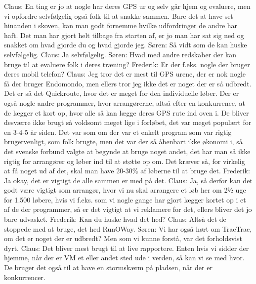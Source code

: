 Claus: En ting er jo at nogle har deres GPS ur og selv går hjem og evaluere, men vi opfordre selvfølgelig også folk til at snakke sammen. Bare det at have set hinanden i skoven, kan man godt fornemme hvilke udfordringer de andre har haft. Det man har gjort helt tilbage fra starten af, er jo man har sat sig ned og snakket om hvad gjorde du og hvad gjorde jeg. \newline
Søren: Så vidt som de kan huske selvfølgelig.\newline
Claus: Ja selvfølgelig. \newline
Søren: Hvad med andre redskaber der kan bruge til at evaluere folk i deres træning?\newline
Frederik: Er der f.eks. nogle der bruger deres mobil telefon?\newline
Claus: Jeg tror det er mest til GPS urene, der er nok nogle få der bruger Endomondo, men ellers tror jeg ikke det er noget der er så udbredt. Det er så det Quickroute, hvor det er meget for den individuelle løber. Der er også nogle andre programmer, hvor arrangørerne, altså efter en konkurrence, at de lægger et kort op, hvor alle så kan lægge deres GPS rute ind oven i. De bliver desværre ikke brugt så voldsomt meget lige i forløbet, det var meget populært for en 3-4-5 år siden. Det var som om der var et enkelt program som var rigtig brugervenligt, som folk brugte, men det var der så åbenbart ikke økonomi i, så det svenske forbund valgte at begynde at bruge noget andet, det har man så ikke rigtig for arrangører og løber ind til at støtte op om. Det kræver så, for virkelig at få noget ud af det, skal man have 20-30\% af løberne til at bruge det. \newline
Frederik: Ja okay, det er vigtigt de alle sammen er med på det. \newline
Claus: Ja, så derfor kan det godt være vigtigt som arrangør, hvor vi nu skal arrangere et løb her om 2½ uge for 1.500 løbere, hvis vi f.eks. som vi nogle gange har gjort lægger kortet op i et af de der programmer, så er det vigtigt at vi reklamere for det, ellers bliver det jo bare udvasket. \newline
Frederik: Kan du huske hvad det hed?\newline
Claus: Altså det de stoppede med at bruge, det hed RunOWay.\newline
Søren: Vi har også hørt om TracTrac, om det er noget der er udbredt? Men som vi kunne forstå, var det forholdsvist dyrt. \newline
Claus: Det bliver mest brugt til at live rapportere. Enten hvis vi sidder der hjemme, når der er VM et eller andet sted ude i verden, så kan vi se med hvor. De bruger det også til at have en stormskærm på pladsen, når der er konkurrencer. \newline
